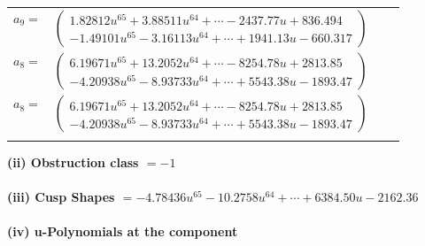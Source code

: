 \documentclass[1p]{elsarticle_modified}
\theoremstyle{definition}
\begin{document}
\begin{tabular}{m{7pt} m{180pt} m{7pt} m{180pt} }
\flushright $a_{9}=$&$\begin{pmatrix}1.82812 u^{65}+3.88511 u^{64}+\cdots-2437.77 u+836.494\\-1.49101 u^{65}-3.16113 u^{64}+\cdots+1941.13 u-660.317\end{pmatrix}$ \\
\flushright $a_{8}=$&$\begin{pmatrix}6.19671 u^{65}+13.2052 u^{64}+\cdots-8254.78 u+2813.85\\-4.20938 u^{65}-8.93733 u^{64}+\cdots+5543.38 u-1893.47\end{pmatrix}$\\ \flushright $a_{8}=$&$\begin{pmatrix}6.19671 u^{65}+13.2052 u^{64}+\cdots-8254.78 u+2813.85\\-4.20938 u^{65}-8.93733 u^{64}+\cdots+5543.38 u-1893.47\end{pmatrix}$\\&\end{tabular}
\flushleft \textbf{(ii) Obstruction class $= -1$}\\~\\
\flushleft \textbf{(iii) Cusp Shapes $= -4.78436 u^{65}-10.2758 u^{64}+\cdots+6384.50 u-2162.36$}\\~\\
\newpage\renewcommand{\arraystretch}{1}
\flushleft \textbf{(iv) u-Polynomials at the component}\newline \\
\end{document}

